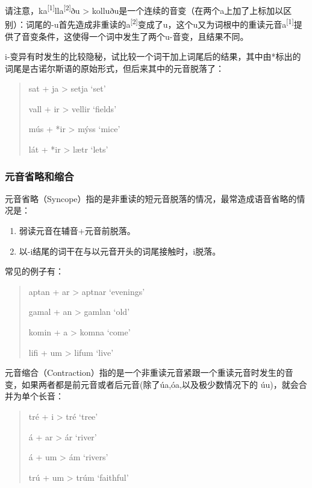 请注意，ka\textsuperscript{[1]}lla\textsuperscript{[2]}ðu > kolluðu是一个连续的音变（在两个a上加了上标加以区别）：词尾的-u首先造成非重读的a\textsuperscript{[2]}变成了u，这个u又为词根中的重读元音a\textsuperscript{[1]}提供了音变条件，这使得一个词中发生了两个u-音变，且结果不同。

i-变异有时发生的比较隐秘，试比较一个词干加上词尾后的结果，其中由*标出的词尾是古诺尔斯语的原始形式，但后来其中的元音脱落了：

\begin{quote}
  sat + ja > setja `set'

  vall + ir > vellir `fields'

  mús + *ir > mýss `mice'

  lát + *ir > lætr `lets'
\end{quote}


\subsubsection{元音省略和缩合}
\label{元音省略和缩合}

元音省略（Syncope）指的是非重读的短元音脱落的情况，最常造成语音省略的情况是：

\begin{info}
  \begin{enumerate}
    \item 弱读元音在辅音+元音前脱落。
    \item 以-i结尾的词干在与以元音开头的词尾接触时，i脱落。
  \end{enumerate}
\end{info}

常见的例子有：

\begin{quote}
  aptan + ar > aptnar `evenings'

  gamal + an > gamlan `old'

  komin + a > komna `come'

  lifi + um > lifum `live'
\end{quote}

元音缩合（Contraction）指的是一个非重读元音紧跟一个重读元音时发生的音变，如果两者都是前元音或者后元音(除了úa,óa,以及极少数情况下的 úu)，就会合并为单个长音：

\begin{quote}
  tré + i > tré `tree'

  á + ar > ár `river'

  á + um > ám `rivers'

  trú + um > trúm `faithful'
\end{quote}

